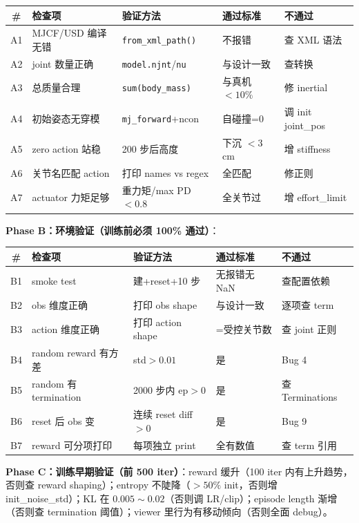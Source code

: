\begin{center}
\small
\begin{tabular}{@{}cp{3.4cm}p{3.2cm}p{2.8cm}p{2.4cm}@{}}
\toprule
\# & 检查项 & 验证方法 & 通过标准 & 不通过 \\
\midrule
A1 & MJCF/USD 编译无错 & \verb|from_xml_path()| & 不报错 & 查 XML 语法 \\
A2 & joint 数量正确 & \verb|model.njnt|/\verb|nu| & 与设计一致 & 查转换 \\
A3 & 总质量合理 & \verb|sum(body_mass)| & 与真机 $<10\%$ & 修 inertial \\
A4 & 初始姿态无穿模 & \verb|mj_forward|+ncon & 自碰撞=0 & 调 init joint\_pos \\
A5 & zero action 站稳 & 200 步后高度 & 下沉 $<3$cm & 增 stiffness \\
A6 & 关节名匹配 action & 打印 names vs regex & 全匹配 & 修正则 \\
A7 & actuator 力矩足够 & 重力矩/max PD $<0.8$ & 全关节过 & 增 effort\_limit \\
\bottomrule
\end{tabular}
\end{center}

\textbf{Phase B：环境验证（训练前必须 100\% 通过）}：

\begin{center}
\small
\begin{tabular}{@{}cp{3.4cm}p{3.4cm}p{2.8cm}p{2.2cm}@{}}
\toprule
\# & 检查项 & 验证方法 & 通过标准 & 不通过 \\
\midrule
B1 & smoke test & 建+reset+10 步 & 无报错无 NaN & 查配置依赖 \\
B2 & obs 维度正确 & 打印 obs shape & 与设计一致 & 逐项查 term \\
B3 & action 维度正确 & 打印 action shape & =受控关节数 & 查 joint 正则 \\
B4 & random reward 有方差 & std$>0.01$ & 是 & Bug 4 \\
B5 & random 有 termination & 2000 步内 ep$>0$ & 是 & 查 Terminations \\
B6 & reset 后 obs 变 & 连续 reset diff$>0$ & 是 & Bug 9 \\
B7 & reward 可分项打印 & 每项独立 print & 全有数值 & 查 term 引用 \\
\bottomrule
\end{tabular}
\end{center}

\textbf{Phase C：训练早期验证（前 500 iter）}：reward 缓升（100 iter 内有上升趋势，否则查 reward shaping）；entropy 不陡降（$>50\%$ init，否则增 init\_noise\_std）；KL 在 $0.005\sim 0.02$（否则调 LR/clip）；episode length 渐增（否则查 termination 阈值）；viewer 里行为有移动倾向（否则全面 debug）。


